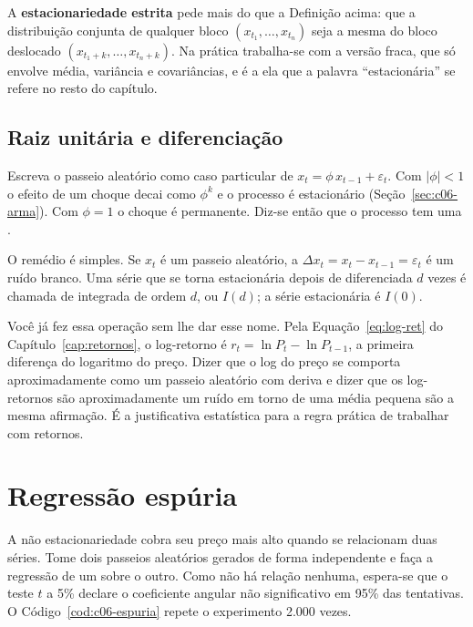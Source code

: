 A \textbf{estacionariedade estrita} pede mais do que a Definição acima: que a distribuição conjunta de qualquer bloco $(x_{t_1}, \dots, x_{t_n})$ seja a mesma do bloco deslocado $(x_{t_1+k}, \dots, x_{t_n+k})$. Na prática trabalha-se com a versão fraca, que só envolve média, variância e covariâncias, e é a ela que a palavra ``estacionária'' se refere no resto do capítulo.

\subsection{Raiz unitária e diferenciação}

Escreva o passeio aleatório como caso particular de $x_t = \phi\,x_{t-1} + \varepsilon_t$. Com $|\phi| < 1$ o efeito de um choque decai como $\phi^k$ e o processo é estacionário (Seção~\ref{sec:c06-arma}). Com $\phi = 1$ o choque é permanente. Diz-se então que o processo tem uma .

O remédio é simples. Se $x_t$ é um passeio aleatório, a  $\Delta x_t = x_t - x_{t-1} = \varepsilon_t$ é um ruído branco. Uma série que se torna estacionária depois de diferenciada $d$ vezes é chamada de integrada de ordem $d$, ou $I(d)$; a série estacionária é $I(0)$.

Você já fez essa operação sem lhe dar esse nome. Pela Equação~\eqref{eq:log-ret} do Capítulo~\ref{cap:retornos}, o log-retorno é $r_t = \ln P_t - \ln P_{t-1}$, a primeira diferença do logaritmo do preço. Dizer que o log do preço se comporta aproximadamente como um passeio aleatório com deriva e dizer que os log-retornos são aproximadamente um ruído em torno de uma média pequena são a mesma afirmação. É a justificativa estatística para a regra prática de trabalhar com retornos.

\section{Regressão espúria}
\label{sec:c06-espuria}

A não estacionariedade cobra seu preço mais alto quando se relacionam duas séries. Tome dois passeios aleatórios gerados de forma independente e faça a regressão de um sobre o outro. Como não há relação nenhuma, espera-se que o teste $t$ a 5\% declare o coeficiente angular não significativo em 95\% das tentativas. O Código~\ref{cod:c06-espuria} repete o experimento 2.000 vezes.

